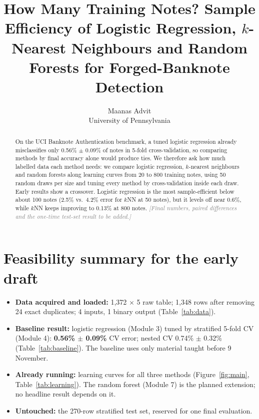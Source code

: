 \documentclass{article}
\title{How Many Training Notes? Sample Efficiency of Logistic Regression, $k$-Nearest Neighbours and Random Forests for Forged-Banknote Detection}
\author{Maanas \qquad Advit \\ University of Pennsylvania}
\newcommand{\todo}[1]{\textcolor{gray}{\textit{[#1]}}}
\begin{document}
\maketitle

\begin{abstract}
On the UCI Banknote Authentication benchmark, a tuned logistic regression already misclassifies only 0.56\% $\pm$ 0.09\% of notes in 5-fold cross-validation, so comparing methods by final accuracy alone would produce ties. We therefore ask how much labelled data each method needs: we compare logistic regression, $k$-nearest neighbours and random forests along learning curves from 20 to 800 training notes, using 50 random draws per size and tuning every method by cross-validation inside each draw. Early results show a crossover. Logistic regression is the most sample-efficient below about 100 notes (2.5\% vs.\ 4.2\% error for $k$NN at 50 notes), but it levels off near 0.6\%, while $k$NN keeps improving to 0.13\% at 800 notes. \todo{Final numbers, paired differences and the one-time test-set result to be added.}
\end{abstract}

\section*{Feasibility summary for the early draft}
\begin{itemize}
  \item \textbf{Data acquired and loaded:} 1,372 $\times$ 5 raw table; 1,348 rows after removing 24 exact duplicates; 4 inputs, 1 binary output (Table~\ref{tab:data}).
  \item \textbf{Baseline result:} logistic regression (Module 3) tuned by stratified 5-fold CV (Module 4): \textbf{0.56\% $\pm$ 0.09\%} CV error; nested CV 0.74\% $\pm$ 0.32\% (Table~\ref{tab:baseline}). The baseline uses only material taught before 9 November.
  \item \textbf{Already running:} learning curves for all three methods (Figure~\ref{fig:main}, Table~\ref{tab:learning}). The random forest (Module 7) is the planned extension; no headline result depends on it.
  \item \textbf{Untouched:} the 270-row stratified test set, reserved for one final evaluation.
\end{itemize}

\end{document}
